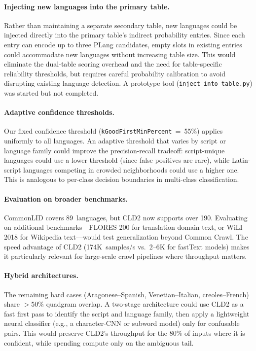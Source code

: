 \documentclass{article}
\begin{document}
\paragraph{Injecting new languages into the primary table.}
Rather than maintaining a separate secondary table, new languages could be injected directly into the primary table's indirect probability entries.
Since each entry can encode up to three PLang candidates, empty slots in existing entries could accommodate new languages without increasing table size.
This would eliminate the dual-table scoring overhead and the need for table-specific reliability thresholds, but requires careful probability calibration to avoid disrupting existing language detection.
A prototype tool (\texttt{inject\_into\_table.py}) was started but not completed.

\paragraph{Adaptive confidence thresholds.}
Our fixed confidence threshold (\texttt{kGoodFirstMinPercent}~=~55\%) applies uniformly to all languages.
An adaptive threshold that varies by script or language family could improve the precision-recall tradeoff:
script-unique languages could use a lower threshold (since false positives are rare), while Latin-script languages competing in crowded neighborhoods could use a higher one.
This is analogous to per-class decision boundaries in multi-class classification.

\paragraph{Evaluation on broader benchmarks.}
CommonLID covers 89~languages, but CLD2 now supports over 190.
Evaluating on additional benchmarks---FLORES-200 for translation-domain text, or WiLI-2018 for Wikipedia text---would test generalization beyond Common Crawl.
The speed advantage of CLD2 (174K~samples/s vs.\ 2--6K for fastText models) makes it particularly relevant for large-scale crawl pipelines where throughput matters.

\paragraph{Hybrid architectures.}
The remaining hard cases (Aragonese--Spanish, Venetian--Italian, creoles--French) share $>$50\% quadgram overlap.
A two-stage architecture could use CLD2 as a fast first pass to identify the script and language family, then apply a lightweight neural classifier (e.g., a character-CNN or subword model) only for confusable pairs.
This would preserve CLD2's throughput for the 80\% of inputs where it is confident, while spending compute only on the ambiguous tail.
\end{document}
